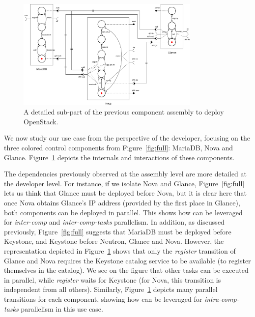 \begin{figure}[t]
  \begin{center}
    \includegraphics[width=0.8\textwidth]{./images/sub2.pdf}
    \caption{A detailed sub-part of the previous component assembly to deploy
    OpenStack.}
    \label{fig:sub}
  \end{center}
\end{figure}

We now study our use case from the perspective of the developer,
focusing on the three colored control components from
Figure~\ref{fig:full}: MariaDB, Nova and Glance. Figure~\ref{fig:sub}
depicts the internals and interactions of these components.

The dependencies previously observed at the assembly level are more
detailed at the developer level. For instance, if we isolate Nova and Glance,
Figure~\ref{fig:full} lets us think that Glance
must be deployed before Nova, but it is clear here that once Nova obtains
Glance's IP address (provided by the first place in Glance), both
components can be deployed in parallel. This shows how \mad can be
leveraged for \emph{inter-comp} and \emph{inter-comp-tasks}
parallelism. In addition, as discussed previously,
Figure~\ref{fig:full} suggests that MariaDB must be deployed before Keystone,
and Keystone before Neutron, Glance and Nova. However, the \mad
representation depicted in Figure~\ref{fig:sub} shows that
only the \emph{register} transition of Glance and Nova requires the
Keystone catalog service to be available (\ie to register themselves
in the catalog). We see on the figure that other tasks can be
executed in parallel, while \emph{register} waits for Keystone (\eg for
Nova, this transition is independent from all others).
Similarly, Figure~\ref{fig:sub} depicts many
parallel transitions for each component, showing how \mad can be leveraged for
\emph{intra-comp-tasks} parallelism in this use case.

